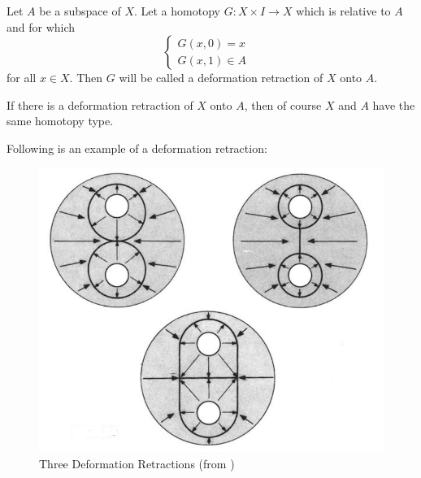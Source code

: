 \begin{defi}
    Let $A$ be a subspace of $X$. Let a homotopy $G:X\times I\to X$ which
    is relative to $A$ and for which
    $$ \begin{cases}
        G(x,0)=x & \\
        G(x,1)\in A
    \end{cases}$$
    for all $x\in X$. Then $G$ will be called a deformation retraction
    of $X$ onto $A$.
\end{defi}
\begin{remark}
    If there is a deformation retraction of $X$ onto $A$, then of
    course $X$ and $A$ have the same homotopy type.
\end{remark}
Following is an example of a deformation retraction:
\begin{figure}[H]
    \centering
    \includegraphics[width=0.8\linewidth]{pics/deformation-retraction.PNG}
    \caption{Three Deformation Retractions (from \cite{book})}
\end{figure}

